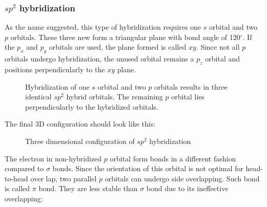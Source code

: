 \documentclass{report}
\begin{document}
			\subsubsection{$sp^2$ hybridization}
				As the name suggested, this type of hybridization requires one $s$ orbital and two $p$ orbitals. These three new form a triangular plane with bond angle of 120$^\circ$. If the $p_x$ and $p_y$ orbitals are used, the plane formed is called $xy$. Since not all $p$ orbitals undergo hybridization, the unused orbital remains a $p_z$ orbital and positions perpendicularly to the $xy$ plane.
				\begin{figure}[H]
				\centering
				\captionsetup{justification=centering, margin=2cm}
			\vspace{5mm}
				\setbondoffset{0pt}
				 \hfill
				\ch{->[Hybridization]} \hfill
			\vspace{5mm}
				\setbondoffset{0pt}
				 \vspace{5mm}
			\caption{Hybridization of one $s$ orbital and two $p$ orbitals results in three identical $sp^2$ hybrid orbitals. The remaining $p$ orbital lies perpendicularly to the hybridized orbitals.}
				\end{figure}
				
				The final 3D configuration should look like this:
				\begin{figure}[H]
			\centering
			\captionsetup{justification=centering, margin=2cm}
			\caption{Three dimensional configuration of $sp^2$ hybridization}
			\end{figure}
			
				The electron in non-hybridized $p$ orbital form bonds in a different fashion compared to $\sigma$ bonds. Since the orientation of this orbital is not optimal for head-to-head over lap, two parallel $p$ orbitals can undergo side overlapping. Such bond is called $\pi$ bond. They are less stable than $\sigma$ bond due to its ineffective overlapping:
			\begin{center}
			\vspace{5mm}
			\setbondoffset{0pt}
			\vspace{7mm}
			\end{center}
			
\end{document}
